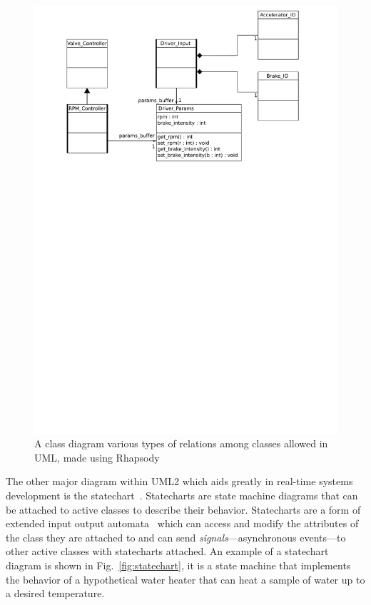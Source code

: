 \begin{figure}
\centering
\includegraphics[scale=0.75]{figs/class_diag}
\caption{A class diagram various types of relations among classes
  allowed in UML, made using Rhapsody}
\label{fig:class_diag}
\end{figure}

The other major diagram within UML2 which aids greatly in real-time
systems development is the statechart~\cite{jansamak@acsc04,
  allen@sigplan95}. Statecharts are state machine diagrams that can be
attached to active classes to describe their behavior. Statecharts are
a form of extended input output automata~\cite{lynch@concur01} which
can access and modify the attributes of the class they are attached to
and can send \emph{signals}---asynchronous events---to other active
classes with statecharts attached. An example of a statechart diagram
is shown in Fig.~\ref{fig:statechart}, it is a state machine that
implements the behavior of a hypothetical water heater that can heat a
sample of water up to a desired temperature.

